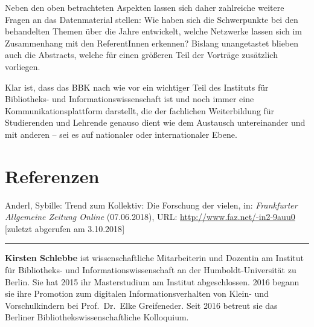 \documentclass[a4paper,
fontsize=11pt,
oneside,
numbers=noperiodatend,
parskip=half-,
bibliography=totoc,
final
]{scrartcl}
\begin{document}
Neben den oben betrachteten Aspekten lassen sich daher zahlreiche
weitere Fragen an das Datenmaterial stellen: Wie haben sich die
Schwerpunkte bei den behandelten Themen über die Jahre entwickelt,
welche Netzwerke lassen sich im Zusammenhang mit den ReferentInnen
erkennen? Bislang unangetastet blieben auch die Abstracts, welche für
einen größeren Teil der Vorträge zusätzlich vorliegen.

Klar ist, dass das BBK nach wie vor ein wichtiger Teil des Instituts für
Bibliotheks- und Informationswissenschaft ist und noch immer eine
Kommunikationsplattform darstellt, die der fachlichen Weiterbildung für
Studierenden und Lehrende genauso dient wie dem Austausch untereinander
und mit anderen -- sei es auf nationaler oder internationaler Ebene.

\hypertarget{referenzen}{%
\section{Referenzen}\label{referenzen}}

Anderl, Sybille: Trend zum Kollektiv: Die Forschung der vielen, in:
\emph{Frankfurter Allgemeine Zeitung Online} (07.06.2018), URL:
\url{http://www.faz.net/-in2-9auu0} {[}zuletzt abgerufen am 3.10.2018{]}

\begin{center}\rule{0.5\linewidth}{\linethickness}\end{center}

\textbf{Kirsten Schlebbe} ist wissenschaftliche Mitarbeiterin und
Dozentin am Institut für Bibliotheks- und Informationswissenschaft an
der Humboldt-Universität zu Berlin. Sie hat 2015 ihr Masterstudium am
Institut abgeschlossen. 2016 begann sie ihre Promotion zum digitalen
Informationsverhalten von Klein- und Vorschulkindern bei Prof.~Dr.~Elke
Greifeneder. Seit 2016 betreut sie das Berliner
Bibliothekswissenschaftliche Kolloquium.
\end{document}
